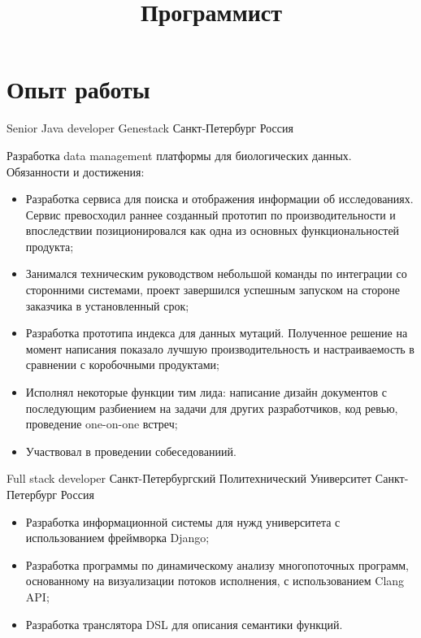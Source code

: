 \documentclass{moderncv}
\title{Программист}
\begin{document}
\makecvtitle

\section{Опыт работы}

        {Senior Java developer}
        {Genestack}
        {Санкт-Петербург}
        {Россия}
        {Разработка data management платформы для биологических данных. \newline{} Обязанности и достижения:
        \begin{itemize}
            \item Разработка сервиса для поиска и отображения информации об исследованиях. 
            Сервис превосходил раннее созданный прототип по производительности и впоследствии 
            позиционировался как одна из основных функциональностей продукта;
            \item Занимался техническим руководством небольшой команды по интеграции со сторонними системами,
            проект завершился успешным запуском на стороне заказчика в установленный срок;
            \item Разработка прототипа индекса для данных мутаций. Полученное решение на момент написания показало
            лучшую производительность и настраиваемость в сравнении с коробочными продуктами;
            \item Исполнял некоторые функции тим лида: написание дизайн документов с последующим разбиением на задачи для других разработчиков, код ревью, проведение one-on-one встреч; 
            \item Участвовал в проведении собеседованиий.
        \end{itemize}}

        {Full stack developer}
        {Санкт-Петербургский Политехнический Университет}
        {Санкт-Петербург}
        {Россия}
        {\begin{itemize}
            \item Разработка информационной системы для нужд университета с использованием фреймворка Django;
            \item Разработка программы по динамическому анализу многопоточных программ, основанному на визуализации
            потоков исполнения, с использованием Clang API;
            \item Разработка транслятора DSL для описания семантики функций.
        \end{itemize}}
\end{document}

